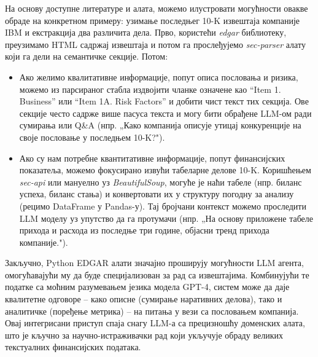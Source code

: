 На основу доступне литературе и алата, можемо илустровати могућности овакве обраде на конкретном примеру: узимање последњег 10-K извештаја компаније IBM и екстракција два различита дела. Прво, користећи \textit{edgar} библиотеку, преузимамо HTML садржај извештаја и потом га прослеђујемо \textit{sec-parser} алату који га дели на семантичке секције. Потом:
\begin{itemize}
    \item Ако желимо квалитативне информације, попут описа пословања и ризика, можемо из парсираног стабла издвојити чланке означене као ``Item 1. Business'' или ``Item 1A. Risk Factors'' и добити чист текст тих секција. Ове секције често садрже више пасуса текста и могу бити обрађене LLM-ом ради сумирања или Q\&A (нпр. „Како компанија описује утицај конкуренције на своје пословање у последњем 10-K?").
    \item Ако су нам потребне квантитативне информације, попут финансијских показатеља, можемо фокусирано извући табеларне делове 10-K. Коришћењем \textit{sec-api} или мануелно уз \textit{BeautifulSoup}, могуће је наћи табеле (нпр. биланс успеха, биланс стања) и конвертовати их у структуру погодну за анализу (рецимо DataFrame у Pandas-у). Тај бројчани контекст можемо проследити LLM моделу уз упутство да га протумачи (нпр. „На основу приложене табеле прихода и расхода из последње три године, објасни тренд прихода компаније.").
\end{itemize}

Закључно, Python EDGAR алати значајно проширују могућности LLM агента, омогућавајући му да буде специјализован за рад са извештајима. Комбинујући те податке са моћним разумевањем језика модела GPT-4, систем може да даје квалитетне одговоре -- како описне (сумирање наративних делова), тако и аналитичке (поређење метрика) -- на питања у вези са пословањем компанија. Овај интегрисани приступ спаја снагу LLM-а са прецизношћу доменских алата, што је кључно за научно-истраживачки рад који укључује обраду великих текстуалних финансијских података.